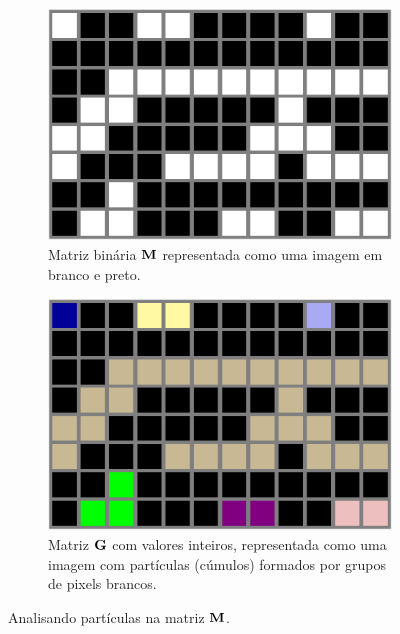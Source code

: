 \begin{figure}[!h]
\centering
    \begin{subfigure}[t]{0.4\textwidth}
        \centering
        \includegraphics[width=\textwidth]{section-cumulos/motivacion-M.eps}
        \caption{Matriz binária $\MATRIX{M}$ representada como uma imagem em branco e preto.}
        \label{fig:motivacion-M}
    \end{subfigure}%
    \hfill%
    \begin{subfigure}[t]{0.4\textwidth}
        \centering
        \includegraphics[width=\textwidth]{section-cumulos/motivacion-GMAP.eps}
        \caption{Matriz $\MATRIX{G}$ com valores inteiros, 
        representada como uma imagem com partículas (cúmulos) formados por grupos de pixels brancos.}
        \label{fig:motivacion-G}
    \end{subfigure}
\caption{Analisando partículas na matriz $\MATRIX{M}$.}
\label{fig:motivacion}
\end{figure}


